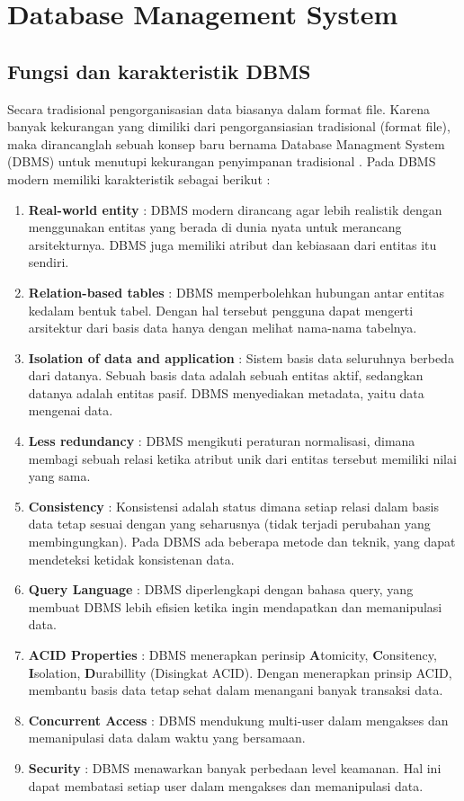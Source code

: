 \section{Database Management System}
\subsection{Fungsi dan karakteristik DBMS}
Secara tradisional pengorganisasian data biasanya dalam format file. Karena banyak kekurangan yang dimiliki dari pengorgansiasian tradisional (format file), maka dirancanglah sebuah konsep baru bernama Database Managment System (DBMS) untuk menutupi kekurangan penyimpanan tradisional \cite{DBMS:2015}.  Pada DBMS modern memiliki karakteristik sebagai berikut :
\begin{enumerate}
	\item \textbf{Real-world entity} : DBMS modern dirancang agar lebih realistik dengan menggunakan entitas yang berada di dunia nyata untuk merancang arsitekturnya. DBMS juga memiliki atribut dan kebiasaan dari entitas itu sendiri.
	\item \textbf{Relation-based tables} : DBMS memperbolehkan hubungan antar entitas kedalam bentuk tabel. Dengan hal tersebut pengguna dapat mengerti arsitektur dari basis data hanya dengan  melihat nama-nama tabelnya.
	\item \textbf{Isolation of data and application} : Sistem basis data seluruhnya berbeda dari datanya. Sebuah basis data adalah sebuah entitas aktif, sedangkan datanya adalah entitas pasif. DBMS menyediakan metadata, yaitu data mengenai data.
	\item \textbf{Less redundancy} : DBMS mengikuti peraturan normalisasi, dimana membagi sebuah relasi ketika atribut unik dari entitas tersebut memiliki nilai yang sama.
	\item \textbf{Consistency} : Konsistensi adalah status dimana setiap relasi dalam basis data tetap sesuai dengan yang seharusnya (tidak terjadi perubahan yang membingungkan). Pada DBMS ada beberapa metode dan teknik, yang dapat mendeteksi ketidak konsistenan data. 
	\item \textbf{Query Language} : DBMS diperlengkapi dengan bahasa query, yang membuat DBMS lebih efisien ketika ingin mendapatkan dan memanipulasi data.  
	\item \textbf{ACID Properties} : DBMS menerapkan perinsip \textbf{A}tomicity, \textbf{C}onsitency, \textbf{I}solation, \textbf{D}urabillity (Disingkat ACID). Dengan menerapkan prinsip ACID, membantu basis data tetap sehat dalam menangani banyak transaksi data. 
	\item \textbf{Concurrent Access} : DBMS mendukung multi-user dalam mengakses dan memanipulasi data dalam waktu yang bersamaan.
	\item \textbf{Security} : DBMS menawarkan banyak perbedaan level keamanan. Hal ini dapat membatasi setiap user dalam mengakses dan memanipulasi data.
\end{enumerate} 
